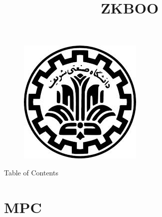 \documentclass{beamer}
\title{
ZKBOO
}
\date{}
\newcommand{\npso}{\text{PSO}}
\newcommand{\nmadjoin}{\text{M-Adjoin}}
\begin{document}
\begin{frame}
\begin{figure}[h]
\centering
\includegraphics[scale=0.2]{logo}
\end{figure}

  \titlepage
\end{frame}

\begin{frame}{Table of Contents}

{\footnotesize{}
\begin{multicols}{2}
\tableofcontents
\end{multicols}	
}	
\end{frame}



\section{MPC}
\end{document}
